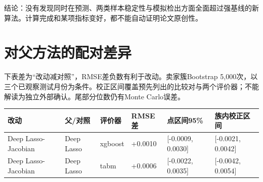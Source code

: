 \documentclass[UTF8,11pt,a4paper]{ctexart}
\begin{document}
结论：没有发现同时在预测、两类样本稳定性与模拟检出方面全面超过强基线的新算法。计算完成和某项指标变好，都不能自动证明论文原创性。

\section{对父方法的配对差异}\label{ux5bf9ux7236ux65b9ux6cd5ux7684ux914dux5bf9ux5deeux5f02}

下表差为``改动减对照''，RMSE差负数有利于改动。卖家簇Bootstrap 5,000次，以三个已观察测试月份为条件。校正区间覆盖预先列出的比较对与两个评价器；不能解读为独立外部确认。尾部分位数仍有Monte Carlo误差。

{\def\LTcaptype{none} %
{
\footnotesize
\begin{longtable}[]{@{}
  >{\raggedright\arraybackslash}p{}
  >{\raggedright\arraybackslash}p{}
  >{\raggedright\arraybackslash}p{}
  >{\raggedright\arraybackslash}p{}
  >{\raggedright\arraybackslash}p{}
  >{\raggedright\arraybackslash}p{}@{}}
\toprule\noalign{}
\begin{minipage}[b]{\linewidth}\raggedright
改动
\end{minipage} & \begin{minipage}[b]{\linewidth}\raggedright
父/对照
\end{minipage} & \begin{minipage}[b]{\linewidth}\raggedright
评价器
\end{minipage} & \begin{minipage}[b]{\linewidth}\raggedright
RMSE差
\end{minipage} & \begin{minipage}[b]{\linewidth}\raggedright
点区间95\%
\end{minipage} & \begin{minipage}[b]{\linewidth}\raggedright
族内校正区间
\end{minipage} \\
\midrule\noalign{}
\endhead
\bottomrule\noalign{}
\endlastfoot
Deep Lasso-Jacobian & Deep Lasso & xgboost & +0.0010 & {[}-0.0009, 0.0030{]} & {[}-0.0021, 0.0042{]} \\
Deep Lasso-Jacobian & Deep Lasso & tabm & +0.0006 & {[}-0.0022, 0.0035{]} & {[}-0.0042, 0.0054{]} \\

\end{longtable}}}
\end{document}
